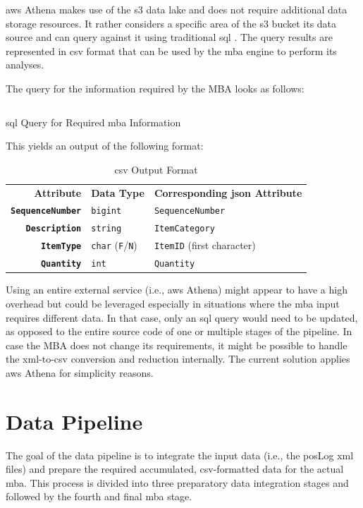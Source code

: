 \ac{aws} Athena makes use of the \ac{s3} data lake and does not require additional data storage resources. It rather considers a specific area of the \ac{s3} bucket its data source and can query against it using traditional \ac{sql} \cite{athena}. The query results are represented in \ac{csv} format that can be used by the \ac{mba} engine to perform its analyses.

The query for the information required by the MBA looks as follows:

\begin{listing}[H]
	\inputminted{sql}{main-matter/src/3-athena-query.sql}
	\caption{\acs{sql} Query for Required \acs{mba} Information}
	\label{src:3-athena-query}
\end{listing}

This yields an output of the following format:
\begin{table}[h!]
	\centering
	\begin{tabular}{r!{\vrule width 1pt}l|l}
		\textbf{Attribute}      & \textbf{Data Type}  & \textbf{Corresponding \acs{json} Attribute}  \\ \ChangeRT{1pt}
		\textbf{\texttt{SequenceNumber}} & \texttt{bigint}     & \texttt{SequenceNumber}               \\ \hline
		\textbf{\texttt{Description}}    & \texttt{string}     & \texttt{ItemCategory}                 \\ \hline
		\textbf{\texttt{ItemType}}       & \texttt{char} (\texttt{F}/\texttt{N}) & \texttt{ItemID} (first character)     \\ \hline
		\textbf{\texttt{Quantity}}       & \texttt{int}        & \texttt{Quantity}                    
	\end{tabular}
	\caption{\acs{csv} Output Format}
	\label{tab:3-csv-format}
\end{table}

Using an entire external service (i.e., \ac{aws} Athena) might appear to have a high overhead but could be leveraged especially in situations where the \ac{mba} input requires different data. In that case, only an \ac{sql} query would need to be updated, as opposed to the entire source code of one or multiple stages of the pipeline. In case the MBA does not change its requirements, it might be possible to handle the \ac{xml}-to-\ac{csv} conversion and reduction internally. The current solution applies \ac{aws} Athena for simplicity reasons.

\section{Data Pipeline} \label{sec:3-data-pipeline}
The goal of the data pipeline is to integrate the input data (i.e., the \ac{pos}Log \ac{xml} files) and prepare the required accumulated, \ac{csv}-formatted data for the actual \ac{mba}. This process is divided into three preparatory data integration stages and followed by the fourth and final \ac{mba} stage.

